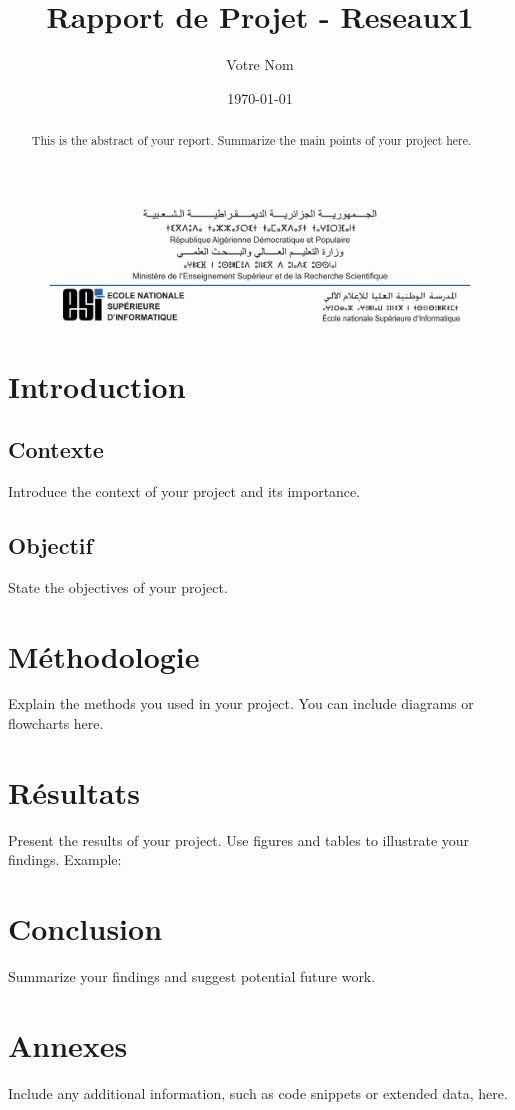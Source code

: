 \documentclass[a4paper,12pt]{report} %
\title{Rapport de Projet - Reseaux1} %
\author{Votre Nom} %
\date{\today} %
\begin{document}
\begin{figure}[h!]
    \centering
    \includegraphics[width=1\textwidth]{./images/esi_header.jpg} %
    \caption*{} %
\end{figure}

\maketitle %

\begin{abstract}
    This is the abstract of your report. Summarize the main points of your project here.
\end{abstract}

\tableofcontents %

\chapter{Introduction}
\section{Contexte}
Introduce the context of your project and its importance.

\section{Objectif}
State the objectives of your project.

\chapter{Méthodologie}
Explain the methods you used in your project. You can include diagrams or flowcharts here.

\chapter{Résultats}
Present the results of your project. Use figures and tables to illustrate your findings. Example:

\begin{figure}[h]
    
\end{figure}

\chapter{Conclusion}
Summarize your findings and suggest potential future work.

\appendix
\chapter{Annexes}
Include any additional information, such as code snippets or extended data, here.
\end{document}
